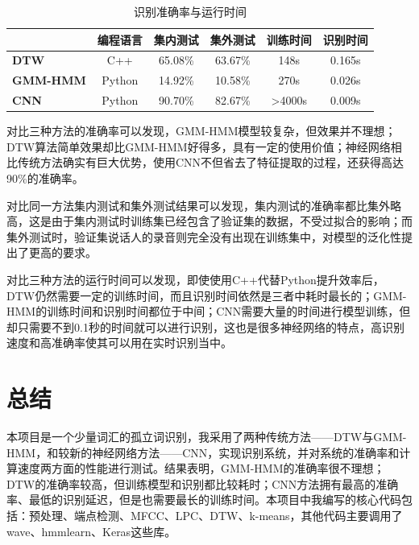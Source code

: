 \documentclass[UTF8]{article}
\begin{document}
\begin{table}[htbp]
	\centering
	\begin{tabular}{|l|c|c|c|c|c|}
		\hline
		                 & \textbf{编程语言} & \textbf{集内测试} & \textbf{集外测试} & \textbf{训练时间} & \textbf{识别时间} \\
		\hline
		\textbf{DTW}     & C++                   & 65.08\%               & 63.67\%               & 148s                  & 0.165s                \\
		\hline
		\textbf{GMM-HMM} & Python                & 14.92\%               & 10.58\%               & 270s                  & 0.026s                \\
		\hline
		\textbf{CNN}     & Python                & 90.70\%               & 82.67\%               & >4000s                & 0.009s                \\
		\hline
	\end{tabular}
	\caption{\label{tab:results}识别准确率与运行时间}
\end{table}

对比三种方法的准确率可以发现，GMM-HMM模型较复杂，但效果并不理想；DTW算法简单效果却比GMM-HMM好得多，具有一定的使用价值；神经网络相比传统方法确实有巨大优势，使用CNN不但省去了特征提取的过程，还获得高达90\%的准确率。

对比同一方法集内测试和集外测试结果可以发现，集内测试的准确率都比集外略高，这是由于集内测试时训练集已经包含了验证集的数据，不受过拟合的影响；而集外测试时，验证集说话人的录音则完全没有出现在训练集中，对模型的泛化性提出了更高的要求。

对比三种方法的运行时间可以发现，即使使用C++代替Python提升效率后，DTW仍然需要一定的训练时间，而且识别时间依然是三者中耗时最长的；GMM-HMM的训练时间和识别时间都位于中间；CNN需要大量的时间进行模型训练，但却只需要不到0.1秒的时间就可以进行识别，这也是很多神经网络的特点，高识别速度和高准确率使其可以用在实时识别当中。

\section{总结}
本项目是一个少量词汇的孤立词识别，我采用了两种传统方法——DTW与GMM-HMM，和较新的神经网络方法——CNN，实现识别系统，并对系统的准确率和计算速度两方面的性能进行测试。结果表明，GMM-HMM的准确率很不理想；DTW的准确率较高，但训练模型和识别都比较耗时；CNN方法拥有最高的准确率、最低的识别延迟，但是也需要最长的训练时间。本项目中我编写的核心代码包括：预处理、端点检测、MFCC、LPC、DTW、k-means，其他代码主要调用了wave、hmmlearn、Keras这些库。



\end{document}
